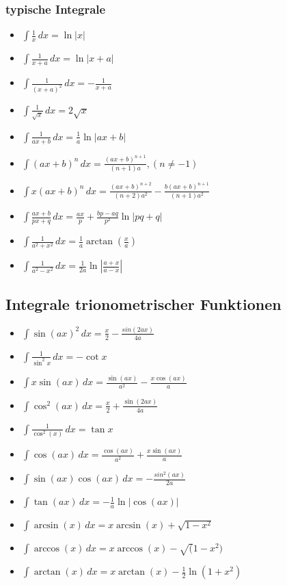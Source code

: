 \begin{multicols}{2}
\subsubsection{typische Integrale}
\begin{itemize}[leftmargin=*]
  	\item $\int \frac{1}{x} \,dx = \ln |x|$
  	\item $\int \frac{1}{x+a} \,dx = \ln |x+a|$
  	\item $\int \frac{1}{(x+a)^2} \,dx = - \frac{1}{x+a}$
  	\item $\int \frac{1}{\sqrt{x}} \,dx = 2 \sqrt{x}$
	\item $\int \frac{1}{ax+b} \,dx = \frac{1}{a} \ln |ax+b|$
	\item $\int(ax + b)^n \,dx = \frac{(ax + b)^{n+1}}{(n + 1)a}, (n \neq -1)$
	\item $\int x(ax+b)^n \,dx = \frac{(ax + b)^{n+2}}{(n+2)a^2} -
	\frac{b(ax+b)^{n+1}}{(n+1)a^2}$
	\item $\int \frac{ax + b}{px + q} \,dx = \frac{ax}{p} + \frac{bp - aq}{p^2} \ln
	|pq+q|$
	\item $\int \frac{1}{a^2 + x^2} \,dx = \frac{1}{a} \arctan(\frac{x}{a})$
	\item $\int \frac{1}{a^2 - x^2} \,dx = \frac{1}{2a} \ln \left | \frac{a+x}{a-x}
	\right |$
\end{itemize}

\subsection{Integrale trionometrischer Funktionen}
\begin{itemize}[leftmargin=*]
	\item $\int \sin(ax)^2 \,dx = \frac{x}{2} - \frac{sin(2ax)}{4a}$
	\item $\int \frac{1}{\sin^2 x} \,dx = -\cot x$
	\item $\int x \sin(ax) \,dx = \frac{\sin(ax)}{a^2} - \frac{x \cos(ax)}{a}$
	\item $\int \cos^2(ax) \,dx = \frac{x}{2} + \frac{\sin(2ax)}{4a}$
	\item $\int \frac{1}{\cos^2(x)} \,dx = \tan x$
	\item $\int \cos(ax) \,dx = \frac{\cos(ax)}{a^2} + \frac{x \sin(ax)}{a}$
	\item $\int \sin(ax) \cos(ax) \,dx = -\frac{sin^2(ax)}{2a}$
	\item $\int \tan(ax) \,dx = - \frac{1}{a} \ln | \cos(ax) |$
	\item $\int \arcsin(x) \,dx = x \arcsin(x) + \sqrt{1 - x^2}$
	\item $\int \arccos(x) \,dx = x \arccos(x) - \sqrt(1-x^2)$
	\item $\int \arctan(x) \,dx = x \arctan(x) - \frac{1}{2} \ln(1+x^2)$
\end{itemize}


\end{multicols}
